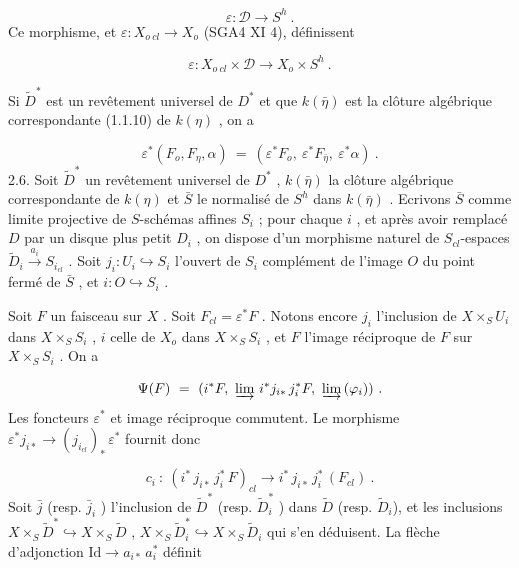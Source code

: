 \begin{equation*}
\varepsilon : \mathcal{D} \longrightarrow S^h \ .
\end{equation*}
Ce morphisme, et $\varepsilon : X_{o\ cl} \longrightarrow X_o$ (SGA4 XI 4), définissent

\begin{equation*}
\varepsilon : X_{o\ cl} \times \mathcal{D} \longrightarrow X_o \times S^h \ .
\end{equation*}


Si $\widetilde{D}^*$ est un revêtement universel de $D^*$ et que $k(\bar{\eta})$ est la clôture algébrique correspondante (1.1.10) de $k(\eta)$ , on a

\begin{equation*}
\varepsilon^*(F_o, F_\eta, \alpha) \ = \ (\varepsilon^* F_o, \ \varepsilon^* F_{\bar{\eta}}, \ \varepsilon^* \alpha) \ .
\end{equation*}
2.6. Soit $\widetilde{D}^*$ un revêtement universel de $D^*$ , $k(\bar{\eta})$ la clôture algébrique correspondante de $k(\eta)$ et $\bar{S}$ le normalisé de $S^h$ dans $k(\bar{\eta})$ . Ecrivons $\bar{S}$ comme limite projective de $S$-schémas affines $S_i$ ; pour chaque $i$ , et après avoir remplacé $D$ par un disque plus petit $D_i$ , on dispose d'un morphisme naturel de $S_{cl}$-espaces $\widetilde{D}_i \xrightarrow{\ a_i\ } S_{i_{cl}}$ . Soit $j_i : U_i \hookrightarrow S_i$ l'ouvert de $S_i$ complément de l'image $O$ du point fermé de $\bar{S}$ , et $i : O \hookrightarrow S_i$ .

Soit $F$ un faisceau sur $X$ . Soit $F_{cl} = \varepsilon^* F$ . Notons encore $j_i$ l'inclusion de $X \times_S U_i$ dans $X \times_S S_i$ , $i$ celle de $X_o$ dans $X \times_S S_i$ , et $F$ l'image réciproque de $F$ sur $X \times_S S_i$ . On a

\begin{equation*}
\Psi(F) \ = \ (i^* F, \ \varinjlim \, i^* j_{i*} \, j_i^* F, \ \varinjlim \, (\varphi_i)) \ .
\end{equation*}
Les foncteurs $\varepsilon^*$ et image réciproque commutent. Le morphisme $\varepsilon^* j_{i*} \longrightarrow (j_{i_{cl}})_* \, \varepsilon^*$ fournit donc

\begin{equation*}
c_i \ : \ (i^* \, j_{i*} \, j_i^* \, F)_{cl} \longrightarrow i^* \, j_{i*} \, j_i^* \, (F_{cl}) \ .
\end{equation*}
Soit $\bar{j}$ (resp. $\bar{j}_i$ ) l'inclusion de $\widetilde{D}^*$ (resp. $\widetilde{D}^*_i$ ) dans $\widetilde{D}$ (resp. $\widetilde{D}_i$), et les inclusions $X \times_S \widetilde{D}^* \hookrightarrow X \times_S \widetilde{D}$ , $X \times_S \widetilde{D}^*_i \hookrightarrow X \times_S \widetilde{D}_i$ qui s'en déduisent. La flèche d'adjonction $\mathrm{Id} \longrightarrow a_{i*} \, a_i^*$ définit

